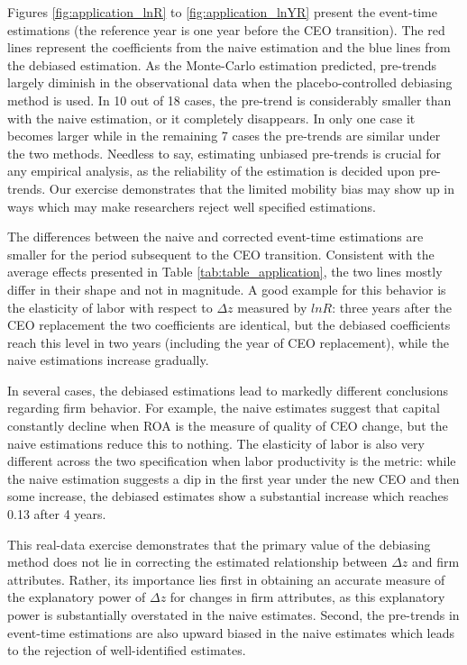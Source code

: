 \documentclass[11pt,a4paper]{article}
\begin{document}
Figures \ref{fig:application_lnR} to \ref{fig:application_lnYR} present the event-time estimations (the reference year is one year before the CEO transition). The red lines represent the coefficients from the naive estimation and the blue lines from the debiased estimation. As the Monte-Carlo estimation predicted, pre-trends largely diminish in the observational data when the placebo-controlled debiasing method is used. In 10 out of 18 cases, the pre-trend is considerably smaller than with the naive estimation, or it completely disappears. In only one case it becomes larger while in the remaining 7 cases the pre-trends are similar under the two methods. Needless to say, estimating unbiased pre-trends is crucial for any empirical analysis, as the reliability of the estimation is decided upon pre-trends. Our exercise demonstrates that the limited mobility bias may show up in ways which may make researchers reject well specified estimations.

The differences between the naive and corrected event-time estimations are smaller for the period subsequent to the CEO transition. Consistent with the average effects presented in Table \ref{tab:table_application}, the two lines mostly differ in their shape and not in magnitude. A good example for this behavior is the elasticity of labor with respect to $\Delta z$ measured by $lnR$: three years after the CEO replacement the two coefficients are identical, but the debiased coefficients reach this level in two years (including the year of CEO replacement), while the naive estimations increase gradually. 

In several cases, the debiased estimations lead to markedly different conclusions regarding firm behavior. For example, the naive estimates suggest that capital constantly decline when ROA is the measure of quality of CEO change, but the naive estimations reduce this to nothing. The elasticity of labor is also very different across the two specification when labor productivity is the metric: while the naive estimation suggests a dip in the first year under the new CEO and then some increase, the debiased estimates show a substantial increase which reaches 0.13 after 4 years.

This real-data exercise demonstrates that the primary value of the debiasing method does not lie in correcting the estimated relationship between $\Delta z$ and firm attributes. Rather, its importance lies first in obtaining an accurate measure of the explanatory power of $\Delta z$ for changes in firm attributes, as this explanatory power is substantially overstated in the naive estimates. Second, the pre-trends in event-time estimations are also upward biased in the naive estimates which leads to the rejection of well-identified estimates.
\end{document}
